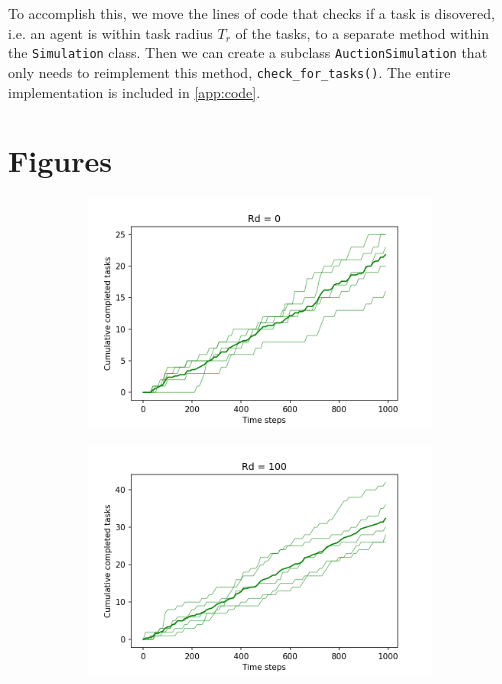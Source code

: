 \documentclass[11pt]{article}
\begin{document}
        To accomplish this, we move the lines of code that checks if a task is 
        disovered, i.e. an agent is within task radius $T_r$ of the tasks, to a
        separate method within the \lstinline|Simulation| class. Then we can 
        create a subclass \lstinline|AuctionSimulation| that only needs to 
        reimplement this method, \lstinline|check_for_tasks()|. The entire implementation is 
        included in \autoref{app:code}.

\printbibliography

\pagebreak
\appendix

\section{Figures}

\begin{figure}[ht]
    \begin{subfigure}{.5\textwidth}
      \centering
      \includegraphics[width=\linewidth]{figures/Rd_0.png}
    \end{subfigure}
    \begin{subfigure}{.5\textwidth}
      \centering
      \includegraphics[width=\linewidth]{figures/Rd_100.png}
    \end{subfigure}
\end{figure}
\end{document}
